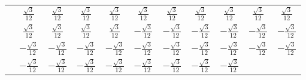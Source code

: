 \documentclass[fleqn,10pt,landscape]{article}
\begin{document}
\begin{itemize}
{\begin{center}
\begin{longtable}{ccccccccccc}
& $ \frac{\sqrt{3}}{12} $ & $ \frac{\sqrt{3}}{12} $ & $ \frac{\sqrt{3}}{12} $ & $ \frac{\sqrt{3}}{12} $ & $ \frac{\sqrt{3}}{12} $ & $ \frac{\sqrt{3}}{12} $ & $ \frac{\sqrt{3}}{12} $ & $ \frac{\sqrt{3}}{12} $ & $ \frac{\sqrt{3}}{12} $ & $ \frac{\sqrt{3}}{12} $ \\
& $ \frac{\sqrt{3}}{12} $ & $ \frac{\sqrt{3}}{12} $ & $ \frac{\sqrt{3}}{12} $ & $ \frac{\sqrt{3}}{12} $ & $ - \frac{\sqrt{3}}{12} $ & $ - \frac{\sqrt{3}}{12} $ & $ - \frac{\sqrt{3}}{12} $ & $ - \frac{\sqrt{3}}{12} $ & $ - \frac{\sqrt{3}}{12} $ & $ - \frac{\sqrt{3}}{12} $ \\
& $ - \frac{\sqrt{3}}{12} $ & $ - \frac{\sqrt{3}}{12} $ & $ - \frac{\sqrt{3}}{12} $ & $ - \frac{\sqrt{3}}{12} $ & $ - \frac{\sqrt{3}}{12} $ & $ - \frac{\sqrt{3}}{12} $ & $ - \frac{\sqrt{3}}{12} $ & $ - \frac{\sqrt{3}}{12} $ & $ - \frac{\sqrt{3}}{12} $ & $ - \frac{\sqrt{3}}{12} $ \\
& $ - \frac{\sqrt{3}}{12} $ & $ - \frac{\sqrt{3}}{12} $ & $ - \frac{\sqrt{3}}{12} $ & $ - \frac{\sqrt{3}}{12} $ & $ - \frac{\sqrt{3}}{12} $ & $ - \frac{\sqrt{3}}{12} $ & $ - \frac{\sqrt{3}}{12} $ & $ - \frac{\sqrt{3}}{12} $ & $  $ & $  $ \\
\end{longtable}
\end{center}
}
\end{itemize}
\end{document}
